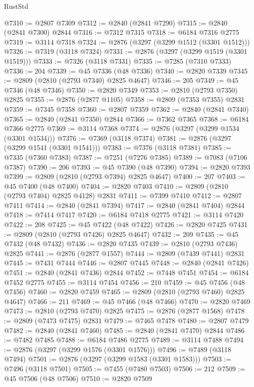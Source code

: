 \begin{lexlean}{RustStd}
\begin{coremodule}
@7310 := @2807 @7309
@7312 := @2840 (@2841 @7290)
@7315 := @2840 (@2841 @7300) @2844
@7316 := @7312 @7315
@7318 := @6184 @7316 @2775
@7319 := @3114 @7318
@7324 := @2876 (@3297 (@3299 @1512 (@3301 @1512)))
@7326 := @7319 (@3118 @7324)
@7331 := @2876 (@3297 (@3299 @1519 (@3301 @1519)))
@7333 := @7326 (@3118 @7331)
@7335 := @7285 (@7310 @7333)
@7336 := 204
@7339 := @45 @7336 (@48 @7336)
@7340 := @2820 @7339
@7345 := @2809 (@2810 (@2793 @7340) @2825 @4647)
@7346 := 205
@7349 := @45 @7346 (@48 @7346)
@7350 := @2820 @7349
@7353 := @2810 (@2793 @7350) @2825
@7355 := @2876 (@2877 @1105)
@7358 := @2809 (@7353 @7355) @2831
@7359 := @7345 @7358
@7360 := @2807 @7359
@7362 := @2840 (@2841 @7340)
@7365 := @2840 (@2841 @7350) @2844
@7366 := @7362 @7365
@7368 := @6184 @7366 @2775
@7369 := @3114 @7368
@7374 := @2876 (@3297 (@3299 @1534 (@3301 @1534)))
@7376 := @7369 (@3118 @7374)
@7381 := @2876 (@3297 (@3299 @1541 (@3301 @1541)))
@7383 := @7376 (@3118 @7381)
@7385 := @7335 (@7360 @7383)
@7387 := @7251 (@7276 @7385)
@7389 := @7083 (@7106 @7387)
@7390 := 206
@7393 := @45 @7390 (@48 @7390)
@7394 := @2820 @7393
@7399 := @2809 (@2810 (@2793 @7394) @2825 @4647)
@7400 := 207
@7403 := @45 @7400 (@48 @7400)
@7404 := @2820 @7403
@7410 := @2809 (@2810 (@2793 @7404) @2825 @4128) @2831
@7411 := @7399 @7410
@7412 := @2807 @7411
@7414 := @2840 (@2841 @7394)
@7417 := @2840 (@2841 @7404) @2844
@7418 := @7414 @7417
@7420 := @6184 @7418 @2775
@7421 := @3114 @7420
@7422 := 208
@7425 := @45 @7422 (@48 @7422)
@7426 := @2820 @7425
@7431 := @2809 (@2810 (@2793 @7426) @2825 @4647)
@7432 := 209
@7435 := @45 @7432 (@48 @7432)
@7436 := @2820 @7435
@7439 := @2810 (@2793 @7436) @2825
@7441 := @2876 (@2877 @1557)
@7444 := @2809 (@7439 @7441) @2831
@7445 := @7431 @7444
@7446 := @2807 @7445
@7448 := @2840 (@2841 @7426)
@7451 := @2840 (@2841 @7436) @2844
@7452 := @7448 @7451
@7454 := @6184 @7452 @2775
@7455 := @3114 @7454
@7456 := 210
@7459 := @45 @7456 (@48 @7456)
@7460 := @2820 @7459
@7465 := @2809 (@2810 (@2793 @7460) @2825 @4647)
@7466 := 211
@7469 := @45 @7466 (@48 @7466)
@7470 := @2820 @7469
@7473 := @2810 (@2793 @7470) @2825
@7475 := @2876 (@2877 @1568)
@7478 := @2809 (@7473 @7475) @2831
@7479 := @7465 @7478
@7480 := @2807 @7479
@7482 := @2840 (@2841 @7460)
@7485 := @2840 (@2841 @7470) @2844
@7486 := @7482 @7485
@7488 := @6184 @7486 @2775
@7489 := @3114 @7488
@7494 := @2876 (@3297 (@3299 @1576 (@3301 @1576)))
@7496 := @7489 (@3118 @7494)
@7501 := @2876 (@3297 (@3299 @1583 (@3301 @1583)))
@7503 := @7496 (@3118 @7501)
@7505 := @7455 (@7480 @7503)
@7506 := 212
@7509 := @45 @7506 (@48 @7506)
@7510 := @2820 @7509

\end{coremodule}
\end{lexlean}
